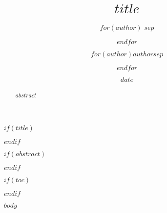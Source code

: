 \documentclass[10pt,conference]{../styles/IEEEtran}
\title{$title$}
\author{
    $for(author)$
        \authorblockN{$author.name$}
        \authorblockA{%
            $author.affiliation$ \\
            $author.location$ \\
            $author.email$}
        $sep$ \and
    $endfor$
}
\author{$for(author)$$author$$sep$ \and $endfor$}
\date{$date$}
\begin{document}
$if(title)$
\maketitle
$endif$

$if(abstract)$
\begin{abstract}
$abstract$
\end{abstract}
$endif$


$if(toc)$
\tableofcontents

$endif$

$body$



\end{document}
